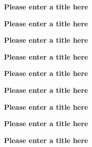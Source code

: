 \vspace{1ex}
\item[] {\bfseries Please enter a title here}

\vspace{1ex}
\item[] {\bfseries Please enter a title here}

\vspace{1ex}
\item[] {\bfseries Please enter a title here}

\vspace{1ex}
\item[] {\bfseries Please enter a title here}

\vspace{1ex}
\item[] {\bfseries Please enter a title here}

\vspace{1ex}
\item[] {\bfseries Please enter a title here}

\vspace{1ex}
\item[] {\bfseries Please enter a title here}

\vspace{1ex}
\item[] {\bfseries Please enter a title here}

\vspace{1ex}
\item[] {\bfseries Please enter a title here}
